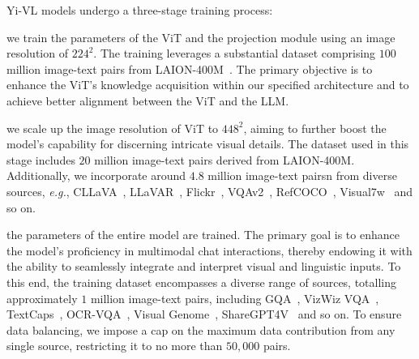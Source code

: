 Yi-VL models undergo a three-stage training process: 
\begin{description}[leftmargin=0.2in]
    \item[Stage 1:] we train the parameters of the ViT and the projection module using an image resolution of $224^2$. The training leverages a substantial dataset comprising $100$ million image-text pairs from LAION-400M~\citep{schuhmann2021laion}. The primary objective is to enhance the ViT's knowledge acquisition within our specified architecture and to achieve better alignment between the ViT and the LLM. 
    \item[Stage 2:] we scale up the image resolution of ViT to $448^2$, aiming to further boost the model's capability for discerning intricate visual details. The dataset used in this stage includes $20$ million image-text pairs derived from LAION-400M. Additionally, we incorporate around $4.8$ million image-text pairsn from diverse sources, \textit{e.g.}, CLLaVA~\citep{linksoulai2023chinesellava}, LLaVAR~\citep{zhang2023llavar}, Flickr~\citep{young2014image}, VQAv2~\citep{goyal2017making}, RefCOCO~\citep{kazemzadeh2014referitgame}, Visual7w~\citep{zhu2016visual7w} and so on.
    \item[Stage 3:] the parameters of the entire model are trained. The primary goal is to enhance the model's proficiency in multimodal chat interactions, thereby endowing it with the ability to seamlessly integrate and interpret visual and linguistic inputs. To this end, the training dataset encompasses a diverse range of sources, totalling approximately $1$ million image-text pairs, including GQA~\citep{hudson2019gqa}, VizWiz VQA~\citep{gurari2018vizwiz}, TextCaps~\citep{sidorov2020textcaps}, OCR-VQA~\citep{mishra2019ocr}, Visual Genome~\citep{krishna2017visual}, ShareGPT4V~\citep{chen2023sharegpt4v} and so on. To ensure data balancing, we impose a cap on the maximum data contribution from any single source, restricting it to no more than $50,000$ pairs. 
\end{description}


